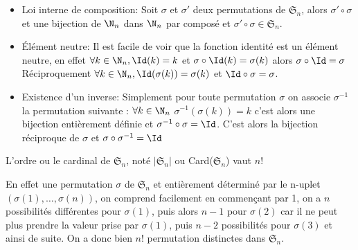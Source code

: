 \begin{prop}
\begin{itemize}
\item Loi interne de composition: Soit $\sigma$ et $\sigma'$ deux permutations de $\mathfrak{S}_n$,
alors $\sigma'\circ\sigma$ et une bijection de $\N_n$ dans $\N_n$ par composé et $\sigma'\circ\sigma\in\mathfrak{S}_n$.

\item Élément neutre: Il est facile de voir que la fonction identité est un élément neutre, en effet $\forall k \in \N_n,\Id(k)=k$ et $\sigma\circ\Id(k)=\sigma(k)$ alors $\sigma\circ\Id=\sigma$
Réciproquement $\forall k \in \N_n,\Id(\sigma(k))=\sigma(k)$ et $\Id\circ\sigma=\sigma$.

\item Existence d'un inverse: Simplement pour toute permutation $\sigma$ on associe $\sigma^{-1}$ la permutation suivante : $\forall k \in \N_n$ $\sigma^{-1}(\sigma(k))=k$ c'est alors une bijection entièrement définie et $\sigma^{-1}\circ\sigma=\Id$. C'est alors la bijection réciproque de $\sigma$ et $\sigma\circ\sigma^{-1}=\Id$
\end{itemize}
\end{prop}

\begin{prop}
L'ordre ou le cardinal de $\mathfrak{S}_n$, noté $\vert \mathfrak{S}_n \vert$ ou Card($\mathfrak{S}_n$) vaut $n!$

En effet une permutation $\sigma$ de $\mathfrak{S}_n$ et entièrement déterminé par le n-uplet $(\sigma(1),\dots,\sigma(n))$, on comprend facilement en commençant par 1, on a $n$ possibilités différentes pour $\sigma(1)$, puis alors $n-1$ pour $\sigma(2)$ car il ne peut plus prendre la valeur prise par $\sigma(1)$, puis $n-2$ possibilités pour $\sigma(3)$ et ainsi de suite.
On a donc bien $n!$ permutation distinctes dans $\mathfrak{S}_n$.
\end{prop}


